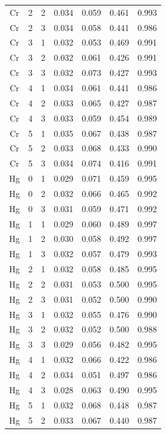 \documentclass[ms, hidelinks]{uncgdissertationexp}
\theoremstyle{plain}
\theoremstyle{definition}
\theoremstyle{remark}
\begin{document}
\begin{longtable}{ccccccc}
Cr & 2 & 2 & 0.034 & 0.059 & 0.461 & 0.993\\
\rowcolor{gray!6}  Cr & 2 & 3 & 0.034 & 0.058 & 0.441 & 0.986\\
Cr & 3 & 1 & 0.032 & 0.053 & 0.469 & 0.991\\
\rowcolor{gray!6}  Cr & 3 & 2 & 0.032 & 0.061 & 0.426 & 0.991\\
Cr & 3 & 3 & 0.032 & 0.073 & 0.427 & 0.993\\
\rowcolor{gray!6}  Cr & 4 & 1 & 0.034 & 0.061 & 0.441 & 0.986\\
Cr & 4 & 2 & 0.033 & 0.065 & 0.427 & 0.987\\
\rowcolor{gray!6}  Cr & 4 & 3 & 0.033 & 0.059 & 0.454 & 0.989\\
Cr & 5 & 1 & 0.035 & 0.067 & 0.438 & 0.987\\
\rowcolor{gray!6}  Cr & 5 & 2 & 0.033 & 0.068 & 0.433 & 0.990\\
Cr & 5 & 3 & 0.034 & 0.074 & 0.416 & 0.991\\
\rowcolor{gray!6}  Hg & 0 & 1 & 0.029 & 0.071 & 0.459 & 0.995\\
Hg & 0 & 2 & 0.032 & 0.066 & 0.465 & 0.992\\
\rowcolor{gray!6}  Hg & 0 & 3 & 0.031 & 0.059 & 0.471 & 0.992\\
Hg & 1 & 1 & 0.029 & 0.060 & 0.489 & 0.997\\
\rowcolor{gray!6}  Hg & 1 & 2 & 0.030 & 0.058 & 0.492 & 0.997\\
Hg & 1 & 3 & 0.032 & 0.057 & 0.479 & 0.993\\
\rowcolor{gray!6}  Hg & 2 & 1 & 0.032 & 0.058 & 0.485 & 0.995\\
Hg & 2 & 2 & 0.031 & 0.053 & 0.500 & 0.995\\
\rowcolor{gray!6}  Hg & 2 & 3 & 0.031 & 0.052 & 0.500 & 0.990\\
Hg & 3 & 1 & 0.032 & 0.055 & 0.476 & 0.990\\
\rowcolor{gray!6}  Hg & 3 & 2 & 0.032 & 0.052 & 0.500 & 0.988\\
Hg & 3 & 3 & 0.029 & 0.056 & 0.482 & 0.995\\
\rowcolor{gray!6}  Hg & 4 & 1 & 0.032 & 0.066 & 0.422 & 0.986\\
Hg & 4 & 2 & 0.034 & 0.051 & 0.497 & 0.986\\
\rowcolor{gray!6}  Hg & 4 & 3 & 0.028 & 0.063 & 0.490 & 0.995\\
Hg & 5 & 1 & 0.032 & 0.068 & 0.448 & 0.987\\
\rowcolor{gray!6}  Hg & 5 & 2 & 0.033 & 0.067 & 0.440 & 0.987\\

\end{longtable}
\end{document}
